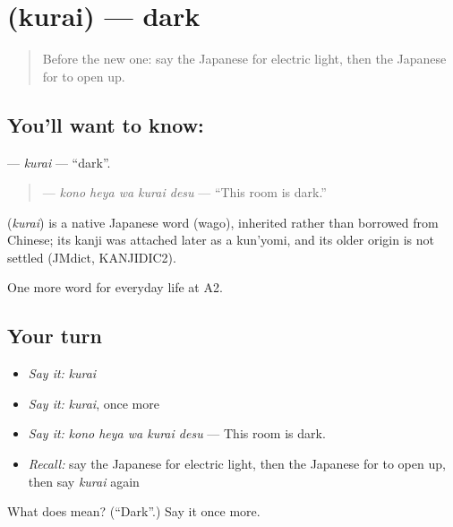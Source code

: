 \section[\texorpdfstring{\ja{くらい} (kurai)}{くらい (kurai)}]{ (kurai) — dark}

\label{lesson:JA-C158-kurai}



\begin{quote}
Before the new one: say the Japanese for electric light, then the Japanese for to open up.
\end{quote}

\subsection*{You'll want to know: }
\textbf{} — \emph{kurai} — \textquotedblleft{}dark\textquotedblright{}.

\begin{quote}
\textbf{  } — \emph{kono heya wa kurai desu} — \textquotedblleft{}This room is dark.\textquotedblright{}
\end{quote}

\begin{cousinweb}
\textbf{} (\emph{kurai}) is a native Japanese word (wago), inherited rather than borrowed from Chinese; its kanji was attached later as a kun'yomi, and its older origin is not settled (JMdict, KANJIDIC2).
\end{cousinweb}

\begin{grammarlens}[title={What you've built}]
One more word for everyday life at A2.
\end{grammarlens}

\subsection*{Your turn}
\begin{itemize}
\raggedright
  \item \emph{Say it:} \emph{kurai}
  \item \emph{Say it:} \emph{kurai}, once more
  \item \emph{Say it:} \emph{kono heya wa kurai desu} — This room is dark.
  \item \emph{Recall:} say the Japanese for electric light, then the Japanese for to open up, then say \emph{kurai} again
\end{itemize}

\begin{tcolorbox}[breakable,colback=teal!4,colframe=teal!35!black,title={Before you move on}]
What does  mean? (\textquotedblleft{}Dark\textquotedblright{}.) Say it once more.
\end{tcolorbox}
